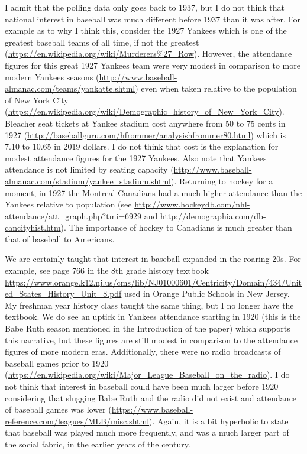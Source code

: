 \documentclass[11pt]{article}
\begin{document}
I admit that the polling data only goes back to 1937, but I do not think that 
national interest in baseball was much different before 1937 than it was 
after.  For example as to why I think this, consider the 1927 Yankees which 
is one of the greatest baseball teams of all time, if not the greatest 
(\url{https://en.wikipedia.org/wiki/Murderers%27_Row}).  
However, the attendance 
figures for this great 1927 Yankees team were very modest in comparison to 
more modern Yankees seasons 
(\url{http://www.baseball-almanac.com/teams/yankatte.shtml})
even when taken relative to the population of New York City 
(\url{https://en.wikipedia.org/wiki/Demographic_history_of_New_York_City}).
Bleacher seat tickets at Yankee stadium cost anywhere from 50 to 75 cents  
in 1927 (\url{http://baseballguru.com/hfrommer/analysishfrommer80.html}) 
which is 7.10 to 10.65 in 2019 dollars. I do not think that cost is the 
explanation for modest attendance figures for the 1927 Yankees.  Also note 
that Yankees attendance is not limited by seating capacity 
(\url{http://www.baseball-almanac.com/stadium/yankee_stadium.shtml}).
Returning to hockey for a moment, in 1927 the Montreal Canadians had a much 
higher attendance than the Yankees relative to population 
(see \url{http://www.hockeydb.com/nhl-attendance/att_graph.php?tmi=6929} and 
\url{http://demographia.com/db-cancityhist.htm}).  The importance of hockey 
to Canadians is much greater than that of baseball to Americans. 


We are certainly taught that interest in baseball expanded in the roaring 
20s.  For example, see page 766 in the 8th grade history textbook 
\url{https://www.orange.k12.nj.us/cms/lib/NJ01000601/Centricity/Domain/434/United_States_History_Unit_8.pdf} 
used in Orange Public Schools in New Jersey.  
My freshman year history class taught the same thing, but I no longer 
have the textbook.
We do see an uptick in 
Yankees attendance starting in 1920 (this is the Babe Ruth season 
mentioned in the Introduction of the paper) which supports this narrative, 
but these figures are still modest in comparison to the attendance figures of 
more modern eras.  Additionally, there were no radio broadcasts of baseball 
games prior to 1920 
(\url{https://en.wikipedia.org/wiki/Major_League_Baseball_on_the_radio}).  
I do not think that interest in baseball could have been much larger before 
1920 considering that slugging Babe Ruth and the radio did not exist and 
attendance of baseball games was lower 
(\url{https://www.baseball-reference.com/leagues/MLB/misc.shtml}).  
Again, it is a bit hyperbolic to state that baseball was played much more 
frequently, and was a much larger part of the social fabric, 
in the earlier years of the century.
\end{document}
